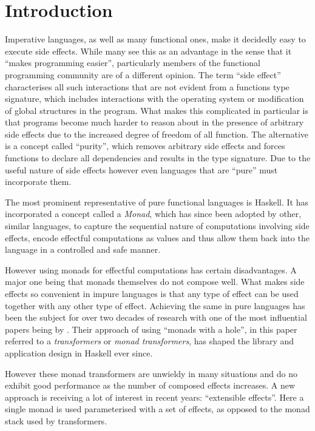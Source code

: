 \section{Introduction}

\label{sec:introduction}

Imperative languages, as well as many functional ones, make it decidedly easy to
execute side effects. While many see this as an advantage in the sense that it
``makes programming easier'', particularly members of the functional programming
community are of a different opinion. The term ``side effect'' characterises all
such interactions that are not evident from a functions type signature, which
includes interactions with the operating system or modification of global
structures in the program. What makes this complicated in particular is that
programs become much harder to reason about in the presence of arbitrary side
effects due to the increased degree of freedom of all function. The alternative
is a concept called ``purity'', which removes arbitrary side effects and forces
functions to declare all dependencies and results in the type signature. Due
to the useful nature of side effects however even languages that are ``pure''
must incorporate them.

The most prominent representative of pure functional languages is Haskell. It
has incorporated a concept called a \emph{Monad}, which has since been adopted
by other, similar languages, to capture the sequential nature of computations
involving side effects, encode effectful computations as values and thus allow
them back into the language in a controlled and safe manner.

However using monads for effectful computations has certain disadvantages. A
major one being that monads themselves do not compose well. What makes side
effects so convenient in impure languages is that any type of effect can be used
together with any other type of effect. Achieving the same in pure languages has
been the subject for over two decades of research with one of the most
influential papers being \cite{transformer-inspiration} by
\citeauthor{transformer-inspiration}. Their approach of using ``monads with a
hole'', in this paper referred to a \emph{transformers} or \emph{monad
  transformers}, has shaped the library and application design in Haskell ever
since.

However these monad transformers are unwieldy in many situations and do no
exhibit good performance as the number of composed effects increases. A new
approach is receiving a lot of interest in recent years: ``extensible effects''.
Here a single monad is used parameterised with a set of effects, as opposed to
the monad stack used by transformers.

